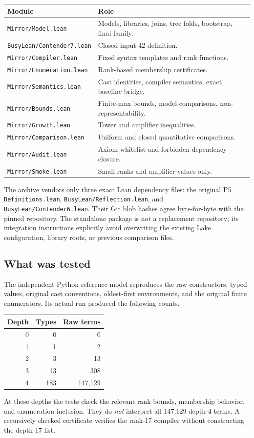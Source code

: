 \documentclass[11pt,letterpaper]{article}
\theoremstyle{definition}
\newcommand{\code}[1]{\nolinkurl{#1}}
\begin{document}
\begin{center}
\begin{tabularx}{\linewidth}{@{}l X@{}}
\toprule
Module & Role\\
\midrule
\code{Mirror/Model.lean} & Models, libraries, joins, tree folds, bootstrap, final family.\\
\code{BusyLean/Contender7.lean} & Closed input-42 definition.\\
\code{Mirror/Compiler.lean} & Fixed syntax templates and rank functions.\\
\code{Mirror/Enumeration.lean} & Rank-based membership certificates.\\
\code{Mirror/Semantics.lean} & Cast identities, compiler semantics, exact baseline bridge.\\
\code{Mirror/Bounds.lean} & Finite-max bounds, model comparisons, non-representability.\\
\code{Mirror/Growth.lean} & Tower and amplifier inequalities.\\
\code{Mirror/Comparison.lean} & Uniform and closed quantitative comparisons.\\
\code{Mirror/Audit.lean} & Axiom whitelist and forbidden dependency closure.\\
\code{Mirror/Smoke.lean} & Small ranks and amplifier values only.\\
\bottomrule
\end{tabularx}
\end{center}

The archive vendors only three exact Lean dependency files: the original P5
\code{Definitions.lean}, \code{BusyLean/Reflection.lean}, and
\code{BusyLean/Contender6.lean}. Their Git blob hashes agree byte-for-byte with
the pinned repository. The standalone package is not a replacement repository;
its integration instructions explicitly avoid overwriting the existing Lake
configuration, library roots, or previous comparison files.

\subsection{What was tested}

The independent Python reference model reproduces the raw constructors,
typed values, original cast conventions, oldest-first environments, and the
original finite enumerators. Its actual run produced the following counts.
\begin{center}
\begin{tabular}{@{}rrr@{}}
\toprule
Depth & Types & Raw terms\\
\midrule
0 & 0 & 0\\
1 & 1 & 2\\
2 & 3 & 13\\
3 & 13 & 308\\
4 & 183 & 147,129\\
\bottomrule
\end{tabular}
\end{center}
At these depths the tests check the relevant rank bounds, membership behavior,
and enumeration inclusion. They do \emph{not} interpret all 147,129 depth-4
terms. A recursively checked certificate verifies the rank-17 compiler without
constructing the depth-17 list.
\end{document}
